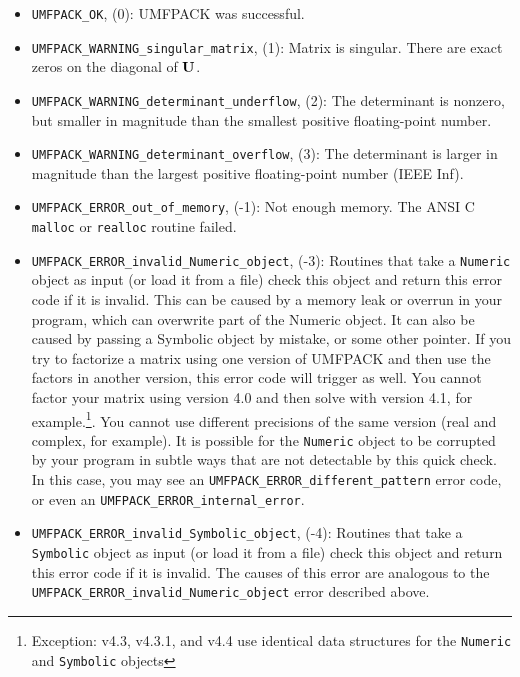 \documentclass[11pt]{article}
\newcommand{\m}[1]{{\bf{#1}}}       %
\begin{document}
\begin{itemize}
\item {\tt UMFPACK\_OK},  (0):  UMFPACK was successful.

\item {\tt UMFPACK\_WARNING\_singular\_matrix},  (1):  Matrix is singular.
    There are exact zeros on the diagonal of $\m{U}$.

\item {\tt UMFPACK\_WARNING\_determinant\_underflow}, (2):
    The determinant is nonzero, but smaller in magnitude than
    the smallest positive floating-point number.

\item {\tt UMFPACK\_WARNING\_determinant\_overflow}, (3):
    The determinant is larger in magnitude than
    the largest positive floating-point number (IEEE Inf).

\item {\tt UMFPACK\_ERROR\_out\_of\_memory},  (-1):  Not enough memory.
    The ANSI C {\tt malloc} or {\tt realloc} routine failed.

\item {\tt UMFPACK\_ERROR\_invalid\_Numeric\_object},  (-3):  
    Routines that take a {\tt Numeric} object as input (or load it
    from a file) check this object and return this error code if it is
    invalid.  This can be caused by a memory leak or overrun in your
    program, which can overwrite part of the Numeric object.  It can also
    be caused by passing a Symbolic object by mistake, or some other pointer.
    If you try to factorize a matrix using one version of UMFPACK and
    then use the factors in another version, this error code will trigger as
    well.  You cannot factor your matrix using
    version 4.0 and then solve with version 4.1, for example.\footnote{
    Exception: v4.3, v4.3.1, and v4.4 use identical data structures
    for the {\tt Numeric} and {\tt Symbolic} objects}.
    You cannot use different precisions of the same version
    (real and complex, for example).
    It is possible for the {\tt Numeric} object to be corrupted by your
    program in subtle ways that are not detectable by this quick check.
    In this case, you may see an
    {\tt UMFPACK\_ERROR\_different\_pattern} error code, or even an
    {\tt UMFPACK\_ERROR\_internal\_error}.

\item {\tt UMFPACK\_ERROR\_invalid\_Symbolic\_object},  (-4):  
    Routines that take a {\tt Symbolic} object as input (or load it
    from a file) check this object and return this error code if it is
    invalid.  The causes of this error are analogous to the
    {\tt UMFPACK\_ERROR\_invalid\_Numeric\_object} error described above.


\end{itemize}
\end{document}
